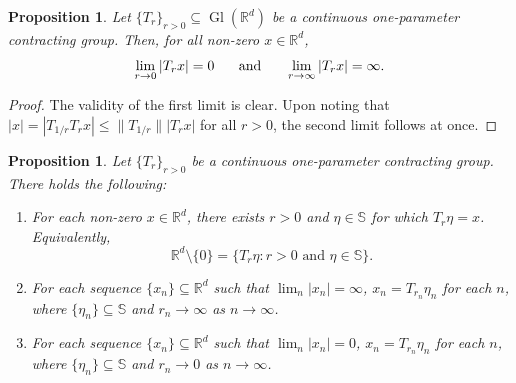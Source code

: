 \documentclass[11pt]{article}
\newtheorem{proposition}[theorem]{Proposition}
\theoremstyle{remark}
\newcommand\Gl{\operatorname{Gl}} %
\begin{document}
\begin{proposition}\label{prop:ContractingLimits}
Let $\{T_r\}_{r>0}\subseteq\Gl(\mathbb{R}^d)$ be a continuous one-parameter contracting group.  Then, for all non-zero $x\in\mathbb{R}^d$,
\begin{equation*}
\lim_{r\rightarrow 0}|T_r x|=0\hspace{.5cm}\mbox{ and }\hspace{.5cm}\lim_{r\rightarrow\infty}|T_r x|=\infty.
\end{equation*}
\end{proposition}
\begin{proof}
The validity of the first limit is clear. Upon noting that $|x|=|T_{1/r}T_rx|\leq \|T_{1/r}\||T_r x|$ for all $r>0$, the second limit follows at once.
\end{proof}
\begin{proposition}\label{prop:ScaleFromSphere}
Let $\{T_r\}_{r>0}$ be a continuous one-parameter contracting group. There holds the following:
\begin{enumerate}[label=(\alph*), ref=(\alph*)]
\item\label{item:ScaleFromSphere_1} For each non-zero $x\in \mathbb{R}^d$, there exists $r>0$ and $\eta\in \mathbb{S}$ for which $T_r\eta=x$. Equivalently,
\begin{equation*}
\mathbb{R}^d\setminus\{0\}=\{T_r\eta:r>0\mbox{ and }\eta\in \mathbb{S}\}.
\end{equation*}
\item\label{item:ScaleFromSphere_2} For each sequence $\{x_n\}\subseteq\mathbb{R}^d$ such that $\lim_n|x_n|=\infty$, $x_n=T_{r_n}\eta_n$ for each $n$, where $\{\eta_n\}\subseteq \mathbb{S}$ and $r_n\rightarrow\infty$ as $n\rightarrow\infty$.
\item\label{item:ScaleFromSphere_3} For each sequence $\{x_n\}\subseteq\mathbb{R}^d$ such that $\lim_n|x_n|=0$, $x_n=T_{r_n}\eta_n$ for each $n$, where $\{\eta_n\}\subseteq \mathbb{S}$ and $r_n\rightarrow 0$ as $n\rightarrow\infty$.
\end{enumerate}
\end{proposition}
\end{document}
